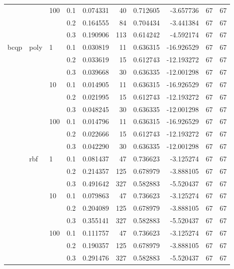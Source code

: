 \begin{table}[H]
\begin{tabular}{llllrrrrrr}
     &     & 100 & 0.1 &  0.074331 &      40 &  0.712605 &  -3.657736 &          67 &        67 \\
     &     &     & 0.2 &  0.164555 &      84 &  0.704434 &  -3.441384 &          67 &        67 \\
     &     &     & 0.3 &  0.190906 &     113 &  0.614242 &  -4.592174 &          67 &        67 \\
bcqp & poly & 1   & 0.1 &  0.030819 &      11 &  0.636315 & -16.926529 &          67 &        67 \\
     &     &     & 0.2 &  0.033619 &      15 &  0.612743 & -12.193272 &          67 &        67 \\
     &     &     & 0.3 &  0.039668 &      30 &  0.636335 & -12.001298 &          67 &        67 \\
     &     & 10  & 0.1 &  0.014905 &      11 &  0.636315 & -16.926529 &          67 &        67 \\
     &     &     & 0.2 &  0.021995 &      15 &  0.612743 & -12.193272 &          67 &        67 \\
     &     &     & 0.3 &  0.048245 &      30 &  0.636335 & -12.001298 &          67 &        67 \\
     &     & 100 & 0.1 &  0.014796 &      11 &  0.636315 & -16.926529 &          67 &        67 \\
     &     &     & 0.2 &  0.022666 &      15 &  0.612743 & -12.193272 &          67 &        67 \\
     &     &     & 0.3 &  0.042290 &      30 &  0.636335 & -12.001298 &          67 &        67 \\
     & rbf & 1   & 0.1 &  0.081437 &      47 &  0.736623 &  -3.125274 &          67 &        67 \\
     &     &     & 0.2 &  0.214357 &     125 &  0.678979 &  -3.888105 &          67 &        67 \\
     &     &     & 0.3 &  0.491642 &     327 &  0.582883 &  -5.520437 &          67 &        67 \\
     &     & 10  & 0.1 &  0.079863 &      47 &  0.736623 &  -3.125274 &          67 &        67 \\
     &     &     & 0.2 &  0.204089 &     125 &  0.678979 &  -3.888105 &          67 &        67 \\
     &     &     & 0.3 &  0.355141 &     327 &  0.582883 &  -5.520437 &          67 &        67 \\
     &     & 100 & 0.1 &  0.111757 &      47 &  0.736623 &  -3.125274 &          67 &        67 \\
     &     &     & 0.2 &  0.190357 &     125 &  0.678979 &  -3.888105 &          67 &        67 \\
     &     &     & 0.3 &  0.291476 &     327 &  0.582883 &  -5.520437 &          67 &        67 \\
\bottomrule
\end{tabular}
\end{table}
